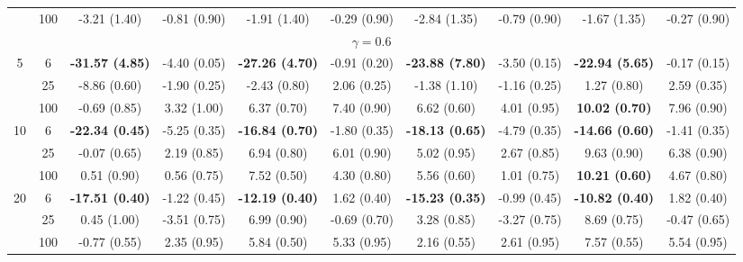 \documentclass[
  man]{apa6}
\newenvironment{lltable}{\begin{landscape}\centering\begin{ThreePartTable}}{\end{ThreePartTable}\end{landscape}}
\begin{document}
\begin{lltable}
{\begin{longtable}{cccccccccc}
 & 100 & -3.21 (1.40) & -0.81 (0.90) & -1.91 (1.40) & -0.29 (0.90) & -2.84 (1.35) & -0.79 (0.90) & -1.67 (1.35) & -0.27 (0.90)\\
\multicolumn{10}{c}{$\gamma = 0.6$}\\
5 & 6 & \textbf{-31.57 (4.85)} & -4.40 (0.05) & \textbf{-27.26 (4.70)} & -0.91 (0.20) & \textbf{-23.88 (7.80)} & -3.50 (0.15) & \textbf{-22.94 (5.65)} & -0.17 (0.15)\\
 & 25 & -8.86 (0.60) & -1.90 (0.25) & -2.43 (0.80) & 2.06 (0.25) & -1.38 (1.10) & -1.16 (0.25) & 1.27 (0.80) & 2.59 (0.35)\\
 & 100 & -0.69 (0.85) & 3.32 (1.00) & 6.37 (0.70) & 7.40 (0.90) & 6.62 (0.60) & 4.01 (0.95) & \textbf{10.02 (0.70)} & 7.96 (0.90)\\
10 & 6 & \textbf{-22.34 (0.45)} & -5.25 (0.35) & \textbf{-16.84 (0.70)} & -1.80 (0.35) & \textbf{-18.13 (0.65)} & -4.79 (0.35) & \textbf{-14.66 (0.60)} & -1.41 (0.35)\\
 & 25 & -0.07 (0.65) & 2.19 (0.85) & 6.94 (0.80) & 6.01 (0.90) & 5.02 (0.95) & 2.67 (0.85) & 9.63 (0.90) & 6.38 (0.90)\\
 & 100 & 0.51 (0.90) & 0.56 (0.75) & 7.52 (0.50) & 4.30 (0.80) & 5.56 (0.60) & 1.01 (0.75) & \textbf{10.21 (0.60)} & 4.67 (0.80)\\
20 & 6 & \textbf{-17.51 (0.40)} & -1.22 (0.45) & \textbf{-12.19 (0.40)} & 1.62 (0.40) & \textbf{-15.23 (0.35)} & -0.99 (0.45) & \textbf{-10.82 (0.40)} & 1.82 (0.40)\\
 & 25 & 0.45 (1.00) & -3.51 (0.75) & 6.99 (0.90) & -0.69 (0.70) & 3.28 (0.85) & -3.27 (0.75) & 8.69 (0.75) & -0.47 (0.65)\\
 & 100 & -0.77 (0.55) & 2.35 (0.95) & 5.84 (0.50) & 5.33 (0.95) & 2.16 (0.55) & 2.61 (0.95) & 7.57 (0.55) & 5.54 (0.95)\\
\bottomrule
\end{longtable}

}

\end{lltable}
\end{document}
